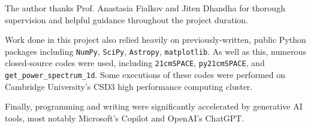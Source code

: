 \documentclass[floats,floatfix,showpacs,amssymb,prd,superscriptaddress,nofootinbib]{revtex4-2} %
\newcommand{\code}{\texttt}
\begin{document}
\begin{acknowledgments}
The author thanks Prof. Anastasia Fialkov and Jiten Dhandha for thorough supervision and helpful guidance throughout the project duration. 

Work done in this project also relied heavily on previously-written, public Python packages including \code{NumPy}, \code{SciPy}, \code{Astropy}, \code{matplotlib}. As well as this, numerous closed-source codes were used, including \code{21cmSPACE}, \code{py21cmSPACE}, and \code{get\_power\_spectrum\_1d}. Some executions of these codes were performed on Cambridge University's CSD3 high performance computing cluster.

Finally, programming and writing were significantly accelerated by generative AI tools, most notably Microsoft's Copilot and OpenAI's ChatGPT. 
\end{acknowledgments}


\nocite{*}

\end{document}
